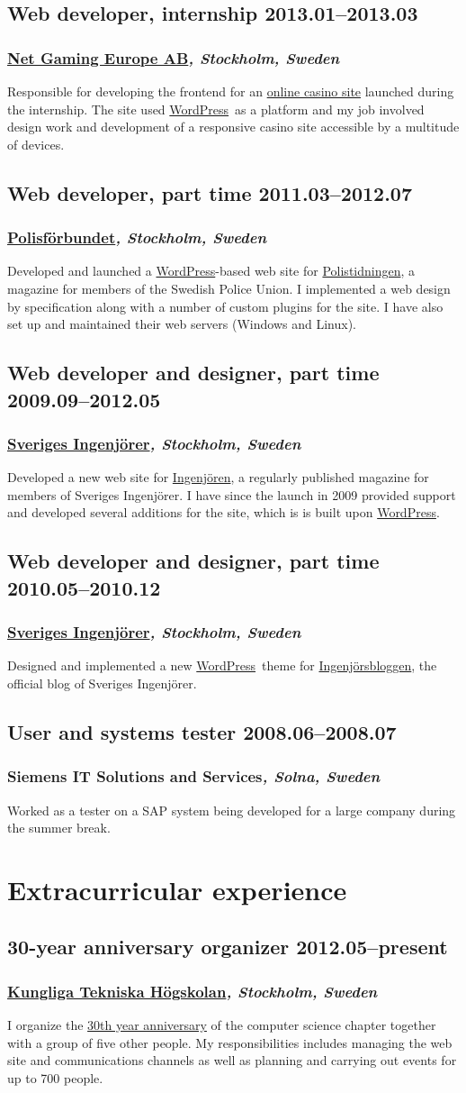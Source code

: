 \documentclass[a4paper,11pt]{article}
\newcommand{\thework}[2]{
  \subsection*{\textbf{#1} \hfill \textbf{#2}}\par%
}
\newcommand{\theplace}[2][]{%
  \subsubsection*{\textbf{#2}\textsl{#1}}%
}
\def\wordpress{\href{http://wordpress.org}{WordPress}}
\begin{document}
\thework{Web developer, internship}{2013.01--2013.03}
\theplace[, Stockholm, Sweden]{\href{http://www.netgaming.se}{Net Gaming Europe AB}}
Responsible for developing the frontend for an \href{http://casinoloco.com}{online casino site} launched during the internship. The site used \wordpress\ as a platform and my job involved design work and development of a responsive casino site accessible by a multitude of devices.

\thework{Web developer, part time}{2011.03--2012.07}
\theplace[, Stockholm, Sweden]{\href{http://www.polisforbundet.se}{Polisförbundet}}
Developed and launched a \wordpress-based web site for \href{http://www.polistidningen.se}{Polistidningen}, a magazine for members of the \mbox{Swedish} Police Union. I implemented a web design by specification along with a number of custom plugins for the site. I have also set up and maintained their web servers (Windows and Linux).

\thework{Web developer and designer, part time}{2009.09--2012.05}
\theplace[, Stockholm, Sweden]{\href{http://www.sverigesingenjorer.se}{Sveriges Ingenjörer}}
Developed a new web site for \href{http://www.ingenjoren.se}{Ingenjören}, a regularly published magazine for members of Sveriges Ingenjörer. I have since the launch in 2009 provided support and developed several additions for the site, which is is built upon \wordpress.

\thework{Web developer and designer, part time}{2010.05--2010.12}
\theplace[, Stockholm, Sweden]{\href{http://www.sverigesingenjorer.se}{Sveriges Ingenjörer}}
Designed and implemented a new \wordpress\ theme for \href{http://www.ingenjorsbloggen.se}{Ingenjörsbloggen}, the official blog of Sveriges Ingenjörer.

\thework{User and systems tester}{2008.06--2008.07}
\theplace[, Solna, Sweden]{Siemens IT Solutions and Services}
Worked as a tester on a SAP system being developed for a large company during the summer break.

\section*{Extracurricular experience}%

\thework{30-year anniversary organizer}{2012.05--present}
\theplace[, Stockholm, Sweden]{\href{http://kth.se}{Kungliga Tekniska Högskolan}}
I organize the \href{http://djubileet.se/}{30th year anniversary} of the computer science chapter together with a group of five other people. My responsibilities includes managing the web site and communications channels as well as planning and carrying out events for up to 700 people.
\end{document}
